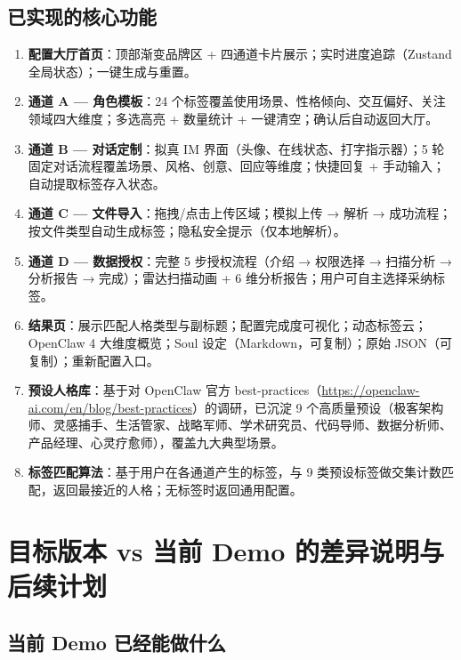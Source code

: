 \documentclass[11pt,a4paper]{ctexart}
\begin{document}
\subsection{已实现的核心功能}

\begin{enumerate}[label=\arabic*.]
  \item \textbf{配置大厅首页}：顶部渐变品牌区 + 四通道卡片展示；实时进度追踪（Zustand 全局状态）；一键生成与重置。
  \item \textbf{通道 A — 角色模板}：24 个标签覆盖使用场景、性格倾向、交互偏好、关注领域四大维度；多选高亮 + 数量统计 + 一键清空；确认后自动返回大厅。
  \item \textbf{通道 B — 对话定制}：拟真 IM 界面（头像、在线状态、打字指示器）；5 轮固定对话流程覆盖场景、风格、创意、回应等维度；快捷回复 + 手动输入；自动提取标签存入状态。
  \item \textbf{通道 C — 文件导入}：拖拽/点击上传区域；模拟上传 → 解析 → 成功流程；按文件类型自动生成标签；隐私安全提示（仅本地解析）。
  \item \textbf{通道 D — 数据授权}：完整 5 步授权流程（介绍 → 权限选择 → 扫描分析 → 分析报告 → 完成）；雷达扫描动画 + 6 维分析报告；用户可自主选择采纳标签。
  \item \textbf{结果页}：展示匹配人格类型与副标题；配置完成度可视化；动态标签云；OpenClaw 4 大维度概览；Soul 设定（Markdown，可复制）；原始 JSON（可复制）；重新配置入口。
  \item \textbf{预设人格库}：基于对 OpenClaw 官方 best-practices（\url{https://openclaw-ai.com/en/blog/best-practices}）的调研，已沉淀 9 个高质量预设（极客架构师、灵感捕手、生活管家、战略军师、学术研究员、代码导师、数据分析师、产品经理、心灵疗愈师），覆盖九大典型场景。
  \item \textbf{标签匹配算法}：基于用户在各通道产生的标签，与 9 类预设标签做交集计数匹配，返回最接近的人格；无标签时返回通用配置。
\end{enumerate}

\section{目标版本 vs 当前 Demo 的差异说明与后续计划}

\subsection{当前 Demo 已经能做什么}
\end{document}
